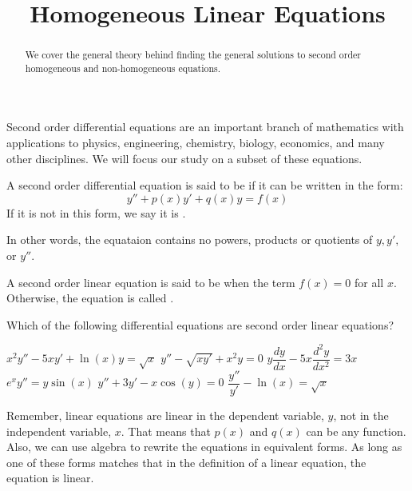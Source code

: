 \documentclass{ximera}
\title[Dig-In:]{Homogeneous Linear Equations}
\begin{document}
	\begin{abstract}
	  We cover the general theory behind finding the general solutions to second order homogeneous and non-homogeneous equations.
	\end{abstract}
	\maketitle

	Second order differential equations are an important branch of mathematics with applications to physics, engineering, chemistry, biology, economics, and many other disciplines.  We will focus our study on a subset of these equations.
	
	\begin{definition}
		A second order differential equation is said to be  if it can be written in the form:
		\[
			y''+p(x)y'+q(x)y = f(x)
		\]
		If it is not in this form, we say it is .  
	\end{definition}
	
	In other words, the equataion contains no powers, products or quotients of $ y, y', $ or $ y'' $.
	
	\begin{definition}
		A second order linear equation is said to be  when the term $ f(x)=0 $ for all $ x $.  Otherwise, the equation is called .
	\end{definition}
	
	\begin{example}
		Which of the following differential equations are second order linear equations?
		\begin{selectAll}
			\choice[correct] $ x^2y''-5xy'+\ln(x)y = \sqrt{x} $
			\choice $ y''-\sqrt{xy'}+x^2y=0 $
			\choice $ y \dfrac{dy}{dx}-5x \dfrac{d^2y}{dx^2} = 3x $
			\choice[correct] $ e^x y''=y \sin(x) $
			\choice $ y''+3y'-x \cos(y) = 0 $
			\choice[correct] $ \dfrac{y''}{y'}-\ln(x) = \sqrt{x} $
		\end{selectAll}
		\begin{feedback}
			Remember, linear equations are linear in the dependent variable, $ y $, not in the independent variable, $ x $.  That means that $ p(x) $ and $ q(x) $ can be any function.  Also, we can use algebra to rewrite the equations in equivalent forms.  As long as one of these forms matches that in the definition of a linear equation, the equation is linear.
		\end{feedback}
	\end{example}
	
\end{document}
